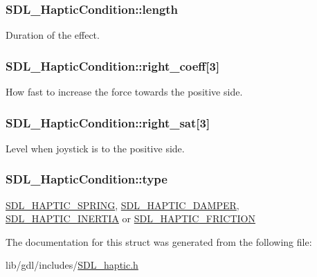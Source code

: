 \subsubsection[{length}]{ S\+D\+L\+\_\+\+Haptic\+Condition\+::length}\label{struct_s_d_l___haptic_condition_ad0efb0a6ddc20f058e87199eaaa95978}
Duration of the effect. \hypertarget{struct_s_d_l___haptic_condition_a3de7f164ef88841255535387d0f100b6}{}
\subsubsection[{right\+\_\+coeff}]{ S\+D\+L\+\_\+\+Haptic\+Condition\+::right\+\_\+coeff\mbox{[}3\mbox{]}}\label{struct_s_d_l___haptic_condition_a3de7f164ef88841255535387d0f100b6}
How fast to increase the force towards the positive side. \hypertarget{struct_s_d_l___haptic_condition_a90427a1e0d464b4b53abc1d419c97b2e}{}
\subsubsection[{right\+\_\+sat}]{ S\+D\+L\+\_\+\+Haptic\+Condition\+::right\+\_\+sat\mbox{[}3\mbox{]}}\label{struct_s_d_l___haptic_condition_a90427a1e0d464b4b53abc1d419c97b2e}
Level when joystick is to the positive side. \hypertarget{struct_s_d_l___haptic_condition_a7be55a9a86c05dd1a54a3006781cfa6f}{}
\subsubsection[{type}]{ S\+D\+L\+\_\+\+Haptic\+Condition\+::type}\label{struct_s_d_l___haptic_condition_a7be55a9a86c05dd1a54a3006781cfa6f}
\hyperlink{_s_d_l__haptic_8h_a3b52d4700380085e2b5d87bb20320fb1}{S\+D\+L\+\_\+\+H\+A\+P\+T\+I\+C\+\_\+\+S\+P\+R\+I\+N\+G}, \hyperlink{_s_d_l__haptic_8h_a69522f261973e3ea4273486141320a87}{S\+D\+L\+\_\+\+H\+A\+P\+T\+I\+C\+\_\+\+D\+A\+M\+P\+E\+R}, \hyperlink{_s_d_l__haptic_8h_a14b807471589120395aec28293cf6642}{S\+D\+L\+\_\+\+H\+A\+P\+T\+I\+C\+\_\+\+I\+N\+E\+R\+T\+I\+A} or \hyperlink{_s_d_l__haptic_8h_a98a5011311168d63921aaac21403a4d8}{S\+D\+L\+\_\+\+H\+A\+P\+T\+I\+C\+\_\+\+F\+R\+I\+C\+T\+I\+O\+N} 

The documentation for this struct was generated from the following file\+:\begin{DoxyCompactItemize}
\item 
lib/gdl/includes/\hyperlink{_s_d_l__haptic_8h}{S\+D\+L\+\_\+haptic.\+h}\end{DoxyCompactItemize}
